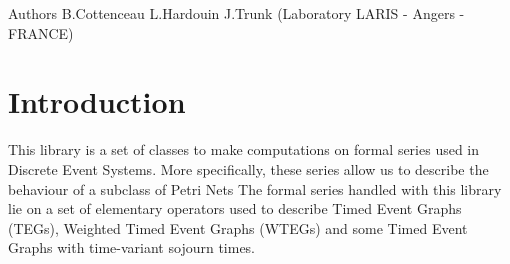 

\begin{DoxyAuthor}{Authors}
B.\+Cottenceau L.\+Hardouin J.\+Trunk (Laboratory L\+A\+R\+IS -\/ Angers -\/ F\+R\+A\+N\+CE)
\end{DoxyAuthor}
\section{Introduction}\label{index_Introduction}
This library is a set of classes to make computations on formal series used in Discrete Event Systems. More specifically, these series allow us to describe the behaviour of a subclass of Petri Nets The formal series handled with this library lie on a set of elementary operators used to describe Timed Event Graphs (T\+E\+Gs), Weighted Timed Event Graphs (W\+T\+E\+Gs) and some Timed Event Graphs with time-\/variant sojourn times. 